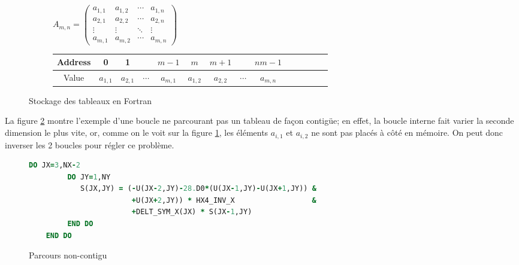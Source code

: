 \begin{figure}[ht]
  \centering
  \begin{subfigure}[b]{1\textwidth}
    \centering
    $A_{m,n} = 
    \begin{pmatrix}
      a_{1,1} & a_{1,2} & \cdots & a_{1,n} \\
      a_{2,1} & a_{2,2} & \cdots & a_{2,n} \\
      \vdots  & \vdots  & \ddots & \vdots  \\
      a_{m,1} & a_{m,2} & \cdots & a_{m,n} 
    \end{pmatrix}
    $
  \end{subfigure}
  \vspace{0.6cm}
  
  \begin{subfigure}[b]{1\textwidth}
    \centering
    \begin{tabular}{|c|c|c|c|c|c|c|c|c|c|c|c|c|c|}
      \hline
      Address & 0 & 1  & & $m-1$ & $m$ & $m+1$ &  & $nm-1$ \\
      \hline
      Value & $a_{1,1}$ & $a_{2,1}$ & $\cdots$ & $a_{m,1}$ & $a_{1,2}$ & $a_{2,2}$ & $\cdots$ & $a_{m,n}$ \\
      \hline
      \end{tabular}
  \end{subfigure}
  \caption{\label{fig:rowmajor}Stockage des tableaux en Fortran}
\end{figure}


La figure \ref{fig:noncontiguous} montre l'exemple d'une boucle ne parcourant pas un tableau de façon contigüe; en effet, la boucle interne fait varier la seconde dimension le plus vite, or, comme on le voit sur la figure \ref{fig:rowmajor}, les éléments $a_{i,1}$ et $a_{i,2}$ ne sont pas placés à côté en mémoire. On peut donc inverser les 2 boucles pour régler ce problème.


\begin{figure}[!ht]
  \centering
  \begin{lstlisting}[language=Fortran]
    DO JX=3,NX-2
         DO JY=1,NY
            S(JX,JY) = (-U(JX-2,JY)-28.D0*(U(JX-1,JY)-U(JX+1,JY)) &
                        +U(JX+2,JY)) * HX4_INV_X                  &
                        +DELT_SYM_X(JX) * S(JX-1,JY)
         END DO
    END DO
  \end{lstlisting}
  \caption{\label{fig:noncontiguous}Parcours non-contigu}
\end{figure}



